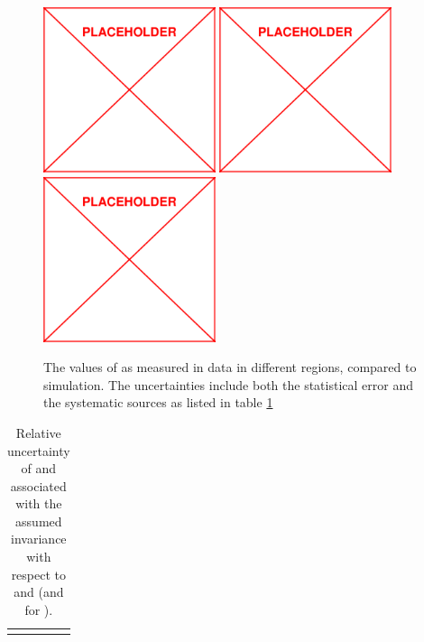 \begin{figure}
	\centering
	\includegraphics[width=0.45\textwidth]{figs/placeholder}
	\includegraphics[width=0.45\textwidth]{figs/placeholder}
	\includegraphics[width=0.45\textwidth]{figs/placeholder}
	\caption{The values of \rb as measured in data in different \nj regions, compared to simulation. The uncertainties include both the statistical error and the systematic sources as listed in table \ref{tbl:fjrbSyst}}
	\label{fig:rb}
\end{figure}
\begin{table}
	\centering
	\begin{tabular}[]{l c r}
		\fm{Table of \fj and \rb systematics} 
	\end{tabular}
	\caption{Relative uncertainty of \fj and \rb associated with the assumed invariance with respect to \mttwo and \dphi (and \HT for \rb).}
	\label{tbl:fjrbSyst}
\end{table}


